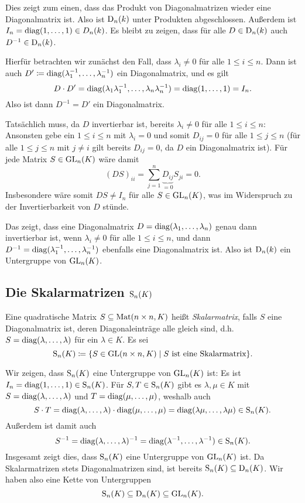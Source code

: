 Dies zeigt zum einen, dass das Produkt von Diagonalmatrizen wieder eine Diagonalmatrix ist. Also ist $\mathrm{D}_n(k)$ unter Produkten abgeschlossen. Außerdem ist $I_n = \mathrm{diag}(1, \dotsc, 1) \in D_n(k)$. Es bleibt zu zeigen, dass für alle $D \in \mathrm{D}_n(k)$ auch $D^{-1} \in \mathrm{D}_n(k)$.

Hierfür betrachten wir zunächst den Fall, dass $\lambda_i \neq 0$ für alle $1 \leq i \leq n$. Dann ist auch $D' \coloneqq \mathrm{diag}(\lambda_1^{-1}, \dotsc, \lambda_n^{-1})$ ein Diagonalmatrix, und es gilt
\[
 D \cdot D'
 = \mathrm{diag}(\lambda_1 \lambda_1^{-1}, \dotsc, \lambda_n \lambda_n^{-1})
 = \mathrm{diag}(1, \dotsc, 1)
 = I_n.
\]
Also ist dann $D^{-1} = D'$ ein Diagonalmatrix.

Tatsächlich muss, da $D$ invertierbar ist, bereits $\lambda_i \neq 0$ für alle $1 \leq i \leq n$: Ansonsten gebe ein $1 \leq i \leq n$ mit $\lambda_i = 0$ und somit $D_{ij} = 0$ für alle $1 \leq j \leq n$ (für alle $1 \leq j \leq n$ mit $j \neq i$ gilt bereits $D_{ij} = 0$, da $D$ ein Diagonalmatrix ist). Für jede Matrix $S \in \mathrm{GL}_n(K)$ wäre damit
\[
 (DS)_{ii}
 = \sum_{j=1}^n \underbrace{D_{ij}}_{=0} S_{ji}
 = 0.
\]
Insbesondere wäre somit $DS \neq I_n$ für alle $S \in \mathrm{GL}_n(K)$, was im Widerspruch zu der Invertierbarkeit von $D$ stünde.

Das zeigt, dass eine Diagonalmatrix $D = \mathrm{diag}(\lambda_1, \dotsc, \lambda_n)$ genau dann invertierbar ist, wenn $\lambda_i \neq 0$ für alle $1 \leq i \leq n$, und dann $D^{-1} = \mathrm{diag}(\lambda_1^{-1}, \dotsc, \lambda_n^{-1})$ ebenfalls eine Diagonalmatrix ist. Also ist $\mathrm{D}_n(k)$ ein Untergruppe von $\mathrm{GL}_n(K)$.


\subsection{Die Skalarmatrizen \texorpdfstring{$\mathrm{S}_n(K)$}{Sn(K)}}
\begin{defi}
 Eine quadratische Matrix $S \subseteq \mathrm{Mat}(n \times n, K)$ heißt \emph{Skalarmatrix}, falls $S$ eine Diagonalmatrix ist, deren Diagonaleinträge alle gleich sind, d.h.\ $S = \mathrm{diag}(\lambda, \dotsc, \lambda)$ für ein $\lambda \in K$. Es sei
 \[
  \mathrm{S}_n(K) \coloneqq \{S \in \mathrm{GL}(n \times n, K) \mid \text{$S$ ist eine Skalarmatrix}\}.
 \]
\end{defi}
Wir zeigen, dass $\mathrm{S}_n(K)$ eine Untergruppe von $\mathrm{GL}_n(K)$ ist: Es ist $I_n = \mathrm{diag}(1, \dotsc, 1) \in \mathrm{S}_n(K)$. Für $S, T \in \mathrm{S}_n(K)$ gibt es $\lambda, \mu \in K$ mit $S = \mathrm{diag}(\lambda, \dotsc, \lambda)$ und $T = \mathrm{diag}(\mu, \dotsc, \mu)$, weshalb auch
\[
 S \cdot T
 = \mathrm{diag}(\lambda, \dotsc, \lambda) \cdot \mathrm{diag}(\mu, \dotsc, \mu)
 = \mathrm{diag}(\lambda \mu, \dotsc, \lambda \mu) \in \mathrm{S}_n(K).
\]
Außerdem ist damit auch
\[
 S^{-1}
 = \mathrm{diag}(\lambda, \dotsc, \lambda)^{-1}
 = \mathrm{diag}(\lambda^{-1}, \dotsc, \lambda^{-1}) \in \mathrm{S}_n(K).
\]
Insgesamt zeigt dies, dass $\mathrm{S}_n(K)$ eine Untergruppe von $\mathrm{GL}_n(K)$ ist. Da Skalarmatrizen stets Diagonalmatrizen sind, ist bereits $\mathrm{S}_n(K) \subseteq \mathrm{D}_n(K)$. Wir haben also eine Kette von Untergruppen
\[
 \mathrm{S}_n(K) \subseteq \mathrm{D}_n(K) \subseteq \mathrm{GL}_n(K).
\]



